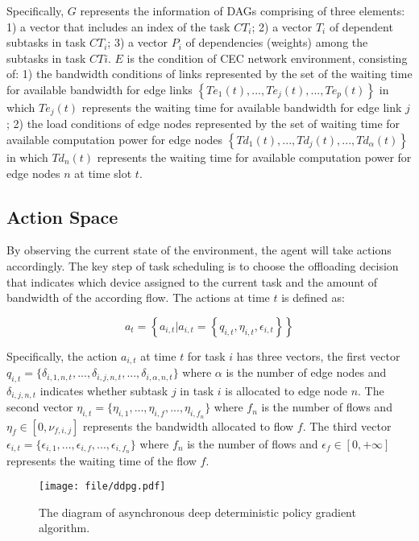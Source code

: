 \documentclass[10pt, conference, letterpaper]{IEEEtran}
\begin{document}
Specifically, $G$ represents the information of DAGs comprising of three elements: 1) a vector that includes an index of the task $CT_i$; 2) a vector $T_i$ of dependent subtasks in task $CT_i$; 3) a vector $P_i$ of dependencies (weights) among the subtasks in task $CTi$. $E$ is the condition of CEC network environment, consisting of: 1) the bandwidth conditions of links represented by the set of the waiting time for available bandwidth for edge links $\left\{Te_1 (t), ... , Te_j (t),... , Te_p (t)\right\}$ in which $Te_j(t)$ represents the waiting time for available bandwidth for edge link $j$ ; 2) the load conditions of edge nodes represented by the set of waiting time for available computation power for edge nodes $\left\{Td_1(t), ...,Td_j (t), ..., Td_\alpha(t)\right\}$ in which $Td_n (t)$ represents the waiting time for available computation power for edge nodes $n$ at time slot $t$. 

\subsection{Action Space} By observing the current state of the environment, the agent will take actions accordingly. The key step of task scheduling is to choose the offloading decision that indicates which device assigned to the current task and the amount of bandwidth of the according flow. The actions at time $t$ is defined as:

\begin{equation}
a_{t} = \left\{ a_{i, t} | a_{i, t} = \left\{ q_{i,t}, \eta_{i,t}, \epsilon_{i,t} \right\} \right\}
\end{equation}

Specifically, the action $a_{i, t}$ at time $t$ for task $i$ has three vectors, the first vector $q_{i,t} = \{\delta_{i,1,n,t}, . . . , \delta_{i,j,n,t} , . . . , \delta_{i, \alpha,n,t} \}$ where $\alpha$ is the number of edge nodes and $\delta_{i,j,n,t}$ indicates whether subtask $j$ in task $i$ is allocated to edge node $n$. The second vector $ \eta_{i,t} = \{\eta_{i,1}, . . . , \eta_{i,f}, . . . , \eta_{i,f_n} \} $ where $f_n$ is the number of flows and $\eta_f \in [0, \nu_{f,i,j}]$ represents the bandwidth allocated to flow $f$. The third vector $\epsilon_{i,t} = \{\epsilon_{i,1}, . . . ,  \epsilon_{i,f} , . . . , \epsilon_{i,f_n} \}$ where $f_n$ is the number of flows and $\epsilon_f \in [0, +\infty]$ represents the waiting time of the flow $f$.

\begin{figure}[t]
		\centering
        \texttt{[image: file/ddpg.pdf]}
        \caption{The diagram of asynchronous deep deterministic policy gradient algorithm.}
        \label{fig_ddpg}
\end{figure}
\end{document}
